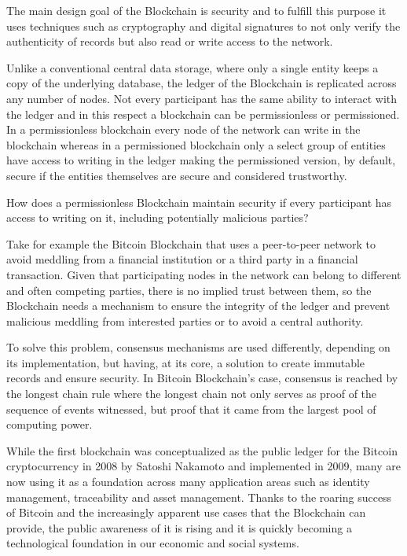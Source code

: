 \documentclass[]{llncs}
\begin{document}
The main design goal of the Blockchain is security and to fulfill this purpose it uses techniques 
such as cryptography and digital signatures to not only verify the authenticity of records but also 
read or write access to the network.

Unlike a conventional central data storage, where only a single entity keeps a copy of the 
underlying database, the ledger of the Blockchain is replicated across any number of nodes. 
Not every participant has the same ability to interact with the ledger and in this respect 
a blockchain can be permissionless or permissioned. In a permissionless blockchain every node of 
the network can write in the blockchain whereas in a permissioned blockchain only a select group 
of entities have access to writing in the ledger making the permissioned version, by default, 
secure if the entities themselves are secure and considered trustworthy.

How does a permissionless Blockchain maintain security if every participant has access to 
writing on it, including potentially malicious parties?

Take for example the Bitcoin Blockchain that uses a peer-to-peer network to avoid meddling 
from a financial institution or a third party in a financial transaction. Given that participating 
nodes in the network can belong to different and often competing parties, there is no implied trust 
between them, so the Blockchain needs a mechanism to ensure the integrity of the ledger and prevent 
malicious meddling from interested parties or to avoid a central authority.\cite{Barclay2017}

To solve this problem, consensus mechanisms are used differently, depending on its implementation, 
but having, at its core, a solution to create immutable records and ensure security. 
In Bitcoin Blockchain’s case, consensus is reached by the longest chain rule where the 
longest chain not only serves as proof of the sequence of events witnessed, 
but proof that it came from the largest pool of computing power.\cite{Baars2016}

While the first blockchain was conceptualized as the public ledger for the Bitcoin cryptocurrency 
in 2008 by Satoshi Nakamoto and implemented in 2009, many are now using it as a foundation across 
many application areas such as identity management, traceability and asset management. 
Thanks to the roaring success of Bitcoin and the increasingly apparent use cases that the 
Blockchain can provide, the public awareness of it is rising and it is quickly becoming a 
technological foundation in our economic and social systems.
\end{document}
